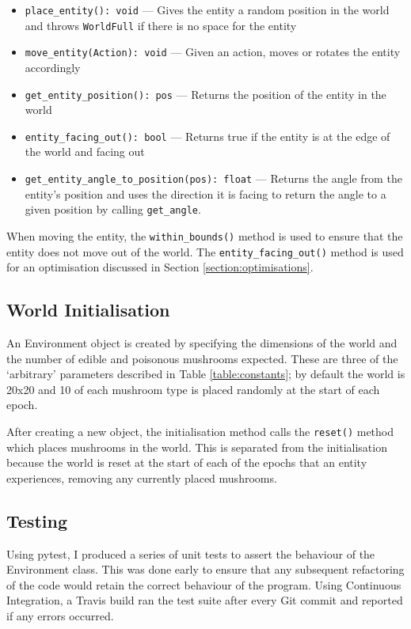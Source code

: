 \documentclass[12pt,a4paper,twoside,openright]{report}
\begin{document}
\begin{itemize}
	\item \texttt{place\_entity(): void} --- Gives the entity a random position in the world and throws \texttt{WorldFull} if there is no space for the entity
	\item \texttt{move\_entity(Action): void} --- Given an action, moves or rotates the entity accordingly
	\item \texttt{get\_entity\_position(): pos} --- Returns the position of the entity in the world
	\item \texttt{entity\_facing\_out(): bool} --- Returns true if the entity is at the edge of the world and facing out
	\item \texttt{get\_entity\_angle\_to\_position(pos): float} --- Returns the angle from the entity's position and uses the direction it is facing to return the angle to a given position by calling \texttt{get\_angle}.
\end{itemize}

When moving the entity, the \texttt{within\_bounds()} method is used to ensure that the entity does not move out of the world. The \texttt{entity\_facing\_out()} method is used for an optimisation discussed in Section \ref{section:optimisations}.

\subsection{World Initialisation}

An Environment object is created by specifying the dimensions of the world and the number of edible and poisonous mushrooms expected. These are three of the `arbitrary' parameters described in Table \ref{table:constants}; by default the world is 20x20 and 10 of each mushroom type is placed randomly at the start of each epoch.

After creating a new object, the initialisation method calls the \texttt{reset()} method which places mushrooms in the world. This is separated from the initialisation because the world is reset at the start of each of the epochs that an entity experiences, removing any currently placed mushrooms.

\subsection{Testing}

Using pytest, I produced a series of unit tests to assert the behaviour of the Environment class. This was done early to ensure that any subsequent refactoring of the code would retain the correct behaviour of the program. Using Continuous Integration, a Travis build ran the test suite after every Git commit and reported if any errors occurred.
\end{document}
